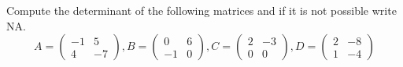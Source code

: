 \documentclass{ximera}
\author{Parisa Fatheddin}
\begin{document}
\begin{exercise}


Compute the determinant of the following matrices and if it is not possible write NA. 
\[A= 
\begin{pmatrix}
-1 & 5\\
4 & -7
\end{pmatrix}, B = \begin{pmatrix} 0 & 6\\
-1 & 0
\end{pmatrix}, C= \begin{pmatrix} 2 & -3 \\
0 & 0
\end{pmatrix}, D = \begin{pmatrix} 2 & -8 \\
1 & -4
\end{pmatrix}\]























\end{exercise}
\end{document}
